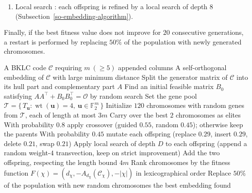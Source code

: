 \documentclass{article}
\newcommand{\wt}{\operatorname{wt}}
\begin{document}
\begin{enumerate}
\begin{enumerate}
        \item Local search : each offspring is refined by a local search of depth $8$ (Subsection~\ref{so-embedding-algorithm}).
    \end{enumerate}
    Finally, if the best fitness value does not improve for $20$ consecutive generations, a restart is performed by replacing $50\%$ of the population with newly generated chromosomes.
\begin{algorithm}[t]
\caption{Genetic Algorithm for Shortest Self-Orthogonal Embedding}
\label{alg:ga-so}
\begin{algorithmic}[1]
\Require A BKLC code $\mathcal{C}$ requiring $m\ (\ge 5)$ appended columns
\Ensure A self-orthogonal embedding of $\mathcal{C}$ with large minimum distance
\State Split the generator matrix of $\mathcal{C}$ into its hull part and complementary part $A$
\State Find an initial feasible matrix $B_0$ satisfying $AA^\top+B_0B_0^\top=\mathcal{O}$ by random search
\State Set the gene pool $\mathcal{T}=\{\,T_\mathbf{u}: \wt(\mathbf{u})=4,\ \mathbf{u}\in\mathbb{F}_2^m\,\}$
    \Statex {}
\State Initialize $120$ chromosomes with random genes from $\mathcal{T}$, each of length at most $3m$
    \State Carry over the best $2$ chromosomes as elites
        \State With probability $0.8$ apply crossover (guided $0.55$, random $0.45$); otherwise keep the parents
        \State With probability $0.45$ mutate each offspring (replace $0.29$, insert $0.29$, delete $0.21$, swap $0.21$)
        \State Apply local search of depth $D$ to each offspring (append a random weight-$4$ transvection, keep on strict improvement)
        \State Add the two offspring, respecting the length bound $4m$
    \EndFor
    \State Rank chromosomes by the fitness function $F(\chi)=(d_{\chi},-A_{d_{\chi}}(\mathcal{C}_{\chi}),-|\chi|)$ in lexicographical order
        \State Replace $50\%$ of the population with new random chromosomes
    \EndIf
\EndFor
\State \Return the best embedding found
\end{algorithmic}
\end{algorithm}
\end{enumerate}
\end{document}
